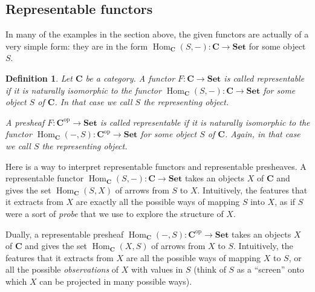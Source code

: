 \documentclass[12pt,oneside,headings=small]{scrbook}
\numberwithin{equation}{section}
\theoremstyle{plain}
\newtheorem{deph}[thm]{Definition}
\theoremstyle{definition}
\DeclareMathOperator{\Hom}{Hom}
\newcommand{\cat}[1]{{\mathbf{#1}}} %
\newcommand{\op}{\mathrm{op}} %
\newcommand{\Set}{\cat{Set}}
\DeclareMathOperator{\1}{\mathbbm{1}}
\DeclareMathOperator{\2}{\mathbbm{2}}
\begin{document}
\subsection{Representable functors}

In many of the examples in the section above, the given functors are actually of a very simple form: they are in the form $\Hom_\cat{C}(S,-):\cat{C}\to\Set$ for some object $S$. 

\begin{deph}
 Let $\cat{C}$ be a category. A functor $F:\cat{C}\to\Set$ is called \emph{representable} if it is naturally isomorphic to the functor $\Hom_\cat{C}(S,-):\cat{C}\to\Set$ for some object $S$ of $\cat{C}$. In that case we call $S$ the \emph{representing object}. 
 
 A presheaf $F:\cat{C}^\op\to\Set$ is called \emph{representable} if it is naturally isomorphic to the functor $\Hom_\cat{C}(-,S):\cat{C}^\op\to\Set$ for some object $S$ of $\cat{C}$. Again, in that case we call $S$ the \emph{representing object}. 
\end{deph}

Here is a way to interpret representable functors and representable presheaves. 
A representable functor $\Hom_\cat{C}(S,-):\cat{C}\to\Set$ takes an objects $X$ of $\cat{C}$ and gives the set $\Hom_\cat{C}(S,X)$ of arrows from $S$ to $X$. Intuitively, the features that it extracts from $X$ are exactly all the possible ways of mapping $S$ into $X$, as if $S$ were a sort of \emph{probe} that we use to explore the structure of $X$.

Dually, a representable presheaf $\Hom_\cat{C}(-,S):\cat{C}^\op\to\Set$ takes an objects $X$ of $\cat{C}$ and gives the set $\Hom_\cat{C}(X,S)$ of arrows from $X$ to $S$. Intuitively, the features that it extracts from $X$ are all the possible ways of mapping $X$ to $S$, or all the possible \emph{observations} of $X$ with values in $S$ (think of $S$ as a ``screen'' onto which $X$ can be projected in many possible ways). 
\end{document}
